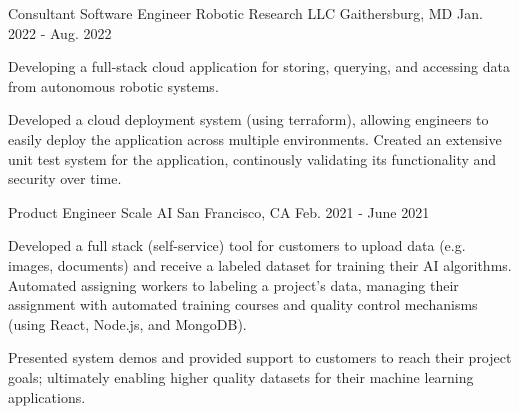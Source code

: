 
\begin{cventries}
  \cventry
    {Consultant Software Engineer} %
    {Robotic Research LLC} %
    {Gaithersburg, MD} %
    {Jan. 2022 - Aug. 2022} %
    {
      \begin{cvitems} %
        \item {Developing a full-stack cloud application for storing, querying, and accessing data from autonomous robotic systems.}
        \item {Developed a cloud deployment system (using terraform), allowing engineers to easily deploy the application across multiple environments.
          Created an extensive unit test system for the application, continously validating its functionality and security over time.
        }
      \end{cvitems}
    }


  \cventry
    {Product Engineer} %
    {Scale AI} %
    {San Francisco, CA} %
    {Feb. 2021 - June 2021} %
    {
      \begin{cvitems} %
        \item {Developed a full stack (self-service) tool for customers to upload data (e.g. images, documents) and receive a labeled dataset for training their AI algorithms.  Automated assigning workers to labeling a project's data, managing their assignment with automated training courses and quality control mechanisms (using React, Node.js, and MongoDB).}
        \item {Presented system demos and provided support to customers to reach their project goals; ultimately enabling higher quality datasets for their machine learning applications.}
      \end{cvitems}
    }


\end{cventries}
